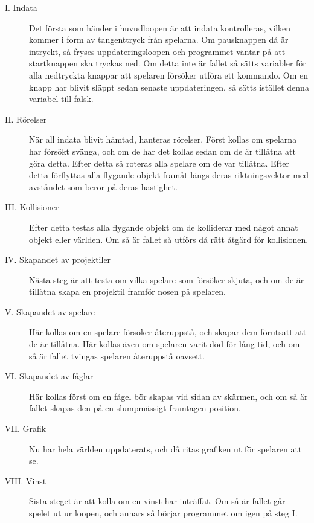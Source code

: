 \documentclass[12pt,a4paper]{article}
\begin{document}
\begin{description}
	\item [  I. Indata] Det första som händer i huvudloopen är att indata kontrolleras, vilken kommer i form av tangenttryck från spelarna. Om pausknappen då är intryckt, så fryses uppdateringsloopen och programmet väntar på att startknappen ska tryckas ned. Om detta inte är fallet så sätts variabler för alla nedtryckta knappar att spelaren försöker utföra ett kommando. Om en knapp har blivit släppt sedan senaste uppdateringen, så sätts istället denna variabel till falsk.
	
	\item [  II. Rörelser] När all indata blivit hämtad, hanteras rörelser. Först kollas om spelarna har försökt svänga, och om de har det kollas sedan om de är tillåtna att göra detta. Efter detta så roteras alla spelare om de var tillåtna. Efter detta förflyttas alla flygande objekt framåt längs deras riktningsvektor med avståndet som beror på deras hastighet.
	
	\item [  III. Kollisioner] Efter detta testas alla flygande objekt om de kolliderar med något annat objekt eller världen. Om så är fallet så utförs då rätt åtgärd för kollisionen.


	\item [  IV. Skapandet av projektiler] Nästa steg är att testa om vilka spelare som försöker skjuta, och om de är tillåtna skapa en projektil framför nosen på spelaren.
	
	\item [  V. Skapandet av spelare] Här kollas om en spelare försöker återuppstå, och skapar dem förutsatt att de är tillåtna. Här kollas även om spelaren varit död för lång tid, och om så är fallet tvingas spelaren återuppstå oavsett.
	
	\item [  VI. Skapandet av fåglar] Här kollas först om en fågel bör skapas vid sidan av skärmen, och om så är fallet skapas den på en slumpmässigt framtagen position.
	
	\item [  VII. Grafik] Nu har hela världen uppdaterats, och då ritas grafiken ut för spelaren att se.
	
	\item [  VIII. Vinst] Sista steget är att kolla om en vinst har inträffat. Om så är fallet går spelet ut ur loopen, och annars så börjar programmet om igen på steg I.
		
\end{description}
\end{document}
